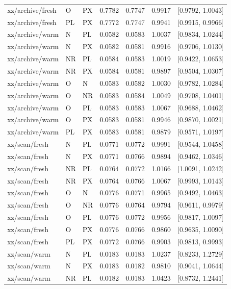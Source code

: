 \begin{longtable}{lllrrrr}
xz/archive/fresh & O & PX & 0.7782 & 0.7747 & 0.9917 & [0.9792, 1.0043] \\
xz/archive/fresh & PL & PX & 0.7772 & 0.7747 & 0.9941 & [0.9915, 0.9966] \\
xz/archive/warm & N & PL & 0.0582 & 0.0583 & 1.0037 & [0.9834, 1.0244] \\
xz/archive/warm & N & PX & 0.0582 & 0.0581 & 0.9916 & [0.9706, 1.0130] \\
xz/archive/warm & NR & PL & 0.0584 & 0.0583 & 1.0019 & [0.9422, 1.0653] \\
xz/archive/warm & NR & PX & 0.0584 & 0.0581 & 0.9897 & [0.9504, 1.0307] \\
xz/archive/warm & O & N & 0.0583 & 0.0582 & 1.0030 & [0.9782, 1.0284] \\
xz/archive/warm & O & NR & 0.0583 & 0.0584 & 1.0049 & [0.9708, 1.0401] \\
xz/archive/warm & O & PL & 0.0583 & 0.0583 & 1.0067 & [0.9688, 1.0462] \\
xz/archive/warm & O & PX & 0.0583 & 0.0581 & 0.9946 & [0.9870, 1.0021] \\
xz/archive/warm & PL & PX & 0.0583 & 0.0581 & 0.9879 & [0.9571, 1.0197] \\
xz/scan/fresh & N & PL & 0.0771 & 0.0772 & 0.9991 & [0.9544, 1.0458] \\
xz/scan/fresh & N & PX & 0.0771 & 0.0766 & 0.9894 & [0.9462, 1.0346] \\
xz/scan/fresh & NR & PL & 0.0764 & 0.0772 & 1.0166 & [1.0091, 1.0242] \\
xz/scan/fresh & NR & PX & 0.0764 & 0.0766 & 1.0067 & [0.9993, 1.0143] \\
xz/scan/fresh & O & N & 0.0776 & 0.0771 & 0.9965 & [0.9492, 1.0463] \\
xz/scan/fresh & O & NR & 0.0776 & 0.0764 & 0.9794 & [0.9611, 0.9979] \\
xz/scan/fresh & O & PL & 0.0776 & 0.0772 & 0.9956 & [0.9817, 1.0097] \\
xz/scan/fresh & O & PX & 0.0776 & 0.0766 & 0.9860 & [0.9635, 1.0090] \\
xz/scan/fresh & PL & PX & 0.0772 & 0.0766 & 0.9903 & [0.9813, 0.9993] \\
xz/scan/warm & N & PL & 0.0183 & 0.0183 & 1.0237 & [0.8233, 1.2729] \\
xz/scan/warm & N & PX & 0.0183 & 0.0182 & 0.9810 & [0.9041, 1.0644] \\
xz/scan/warm & NR & PL & 0.0182 & 0.0183 & 1.0423 & [0.8732, 1.2441] \\

\end{longtable}
